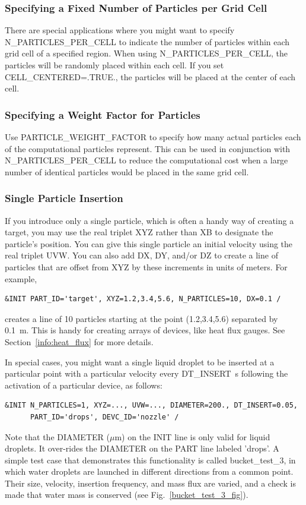 \documentclass[11pt]{book}
\begin{document}
\subsubsection{Specifying a Fixed Number of Particles per Grid Cell}

There are special applications where you might want to specify {\ct N\_PARTICLES\_PER\_CELL} to indicate the number of particles within each grid cell of a specified region. When using {\ct N\_PARTICLES\_PER\_CELL}, the particles will be randomly placed within each cell.  If you set {\ct CELL\_CENTERED=.TRUE.}, the particles will be placed at the center of each cell.

\subsubsection{Specifying a Weight Factor for Particles}

Use {\ct PARTICLE\_WEIGHT\_FACTOR} to specify how many actual particles each of the computational particles represent. This can be used in conjunction with {\ct N\_PARTICLES\_PER\_CELL} to reduce the computational cost when a large number of identical particles would be placed in the same grid cell.


\subsubsection{Single Particle Insertion}
\label{bucket_test_3}

If you introduce only a single particle, which is often a handy way of creating a target, you may use the real triplet {\ct XYZ} rather than {\ct XB} to designate the particle's position.  You can give this single particle an initial velocity using the real triplet {\ct UVW}. You can also add {\ct DX}, {\ct DY}, and/or {\ct DZ} to create a line of particles that are offset from {\ct XYZ} by these increments in units of meters. For example,
\begin{lstlisting}
&INIT PART_ID='target', XYZ=1.2,3.4,5.6, N_PARTICLES=10, DX=0.1 /
\end{lstlisting}
creates a line of 10 particles starting at the point (1.2,3.4,5.6) separated by 0.1~m. This is handy for creating arrays of devices, like heat flux gauges. See Section~\ref{info:heat_flux} for more details.

In special cases, you might want a single liquid droplet to be inserted at a particular point with a particular velocity every {\ct DT\_INSERT}~s following the activation of a particular device, as follows:
\begin{lstlisting}
&INIT N_PARTICLES=1, XYZ=..., UVW=..., DIAMETER=200., DT_INSERT=0.05,
      PART_ID='drops', DEVC_ID='nozzle' /
\end{lstlisting}
Note that the {\ct DIAMETER} ($\mu$m) on the {\ct INIT} line is only valid for liquid droplets. It over-rides the {\ct DIAMETER} on the {\ct PART} line labeled {\ct 'drops'}. A simple test case that demonstrates this functionality is called {\ct bucket\_test\_3}, in which water droplets are launched in different directions from a common point. Their size, velocity, insertion frequency, and mass flux are varied, and a check is made that water mass is conserved (see Fig.~\ref{bucket_test_3_fig}).
\end{document}
